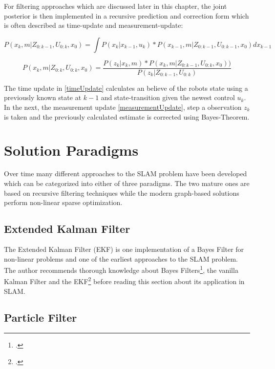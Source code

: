 
For filtering approaches which are discussed later in this chapter, the joint posterior is then implemented in a recursive prediction and correction form which is often described as time-update and measurement-update:

\begin{equation}\label{timeUpdate}
	P(x_{k}, m | Z_{0:k-1}, U_{0:k}, x_{0}) = \int P(x_{k} | x_{k-1}, u_{k}) * P(x_{k-1}, m | Z_{0:k-1}, U_{0:k-1}, x_{0}) dx_{k-1}
\end{equation}


\begin{equation}\label{measurementUpdate}
	P(x_{k}, m | Z_{0:k}, U_{0:k}, x_{0}) = \frac{P(z_{k} | x_{k}, m) * P(x_{k}, m | Z_{0:k-1}, U_{0:k}, x_{0}))}{P(z_{k} | Z_{0:k-1}, U_{0:k})}
\end{equation}

The time update in \ref{timeUpdate} calculates an believe of the robots state using a previously known state at $ k - 1 $ and state-transition given the newest control $ u_{k} $.
In the next, the measurement update \ref{measurementUpdate}, step a observation $z_{k} $ is taken and the previously calculated estimate is corrected using Bayes-Theorem. 

\section{Solution Paradigms} 
Over time many different approaches to the SLAM problem have been developed which can be categorized into either of three paradigms. The two mature ones are based on recursive filtering techniques while the modern graph-based solutions perform non-linear sparse optimization.

\subsection{Extended Kalman Filter}
The Extended Kalman Filter (EKF) is one implementation of a Bayes Filter for non-linear problems and one of the earliest approaches to the SLAM problem. The author recommends thorough knowledge about Bayes Filters\footcite{tipaldiBayes2020}, the vanilla Kalman Filter and the EKF\footcite{tipaldiEKF2020} before reading this section about its application in SLAM. 


\subsection{Particle Filter}

